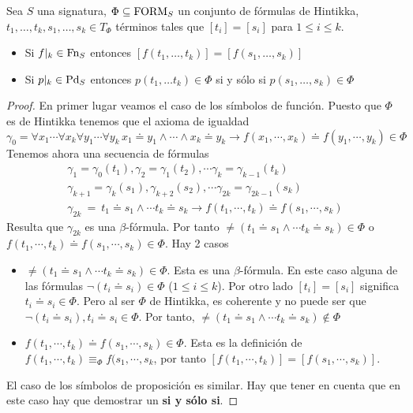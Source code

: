 \begin{prop}
  Sea $S$ una signatura, $\Phi\subseteq\mbox{FORM}_{S}$ un conjunto de fórmulas de Hintikka, $t_{1},\ldots, t_{k},s_{1},\ldots, s_{k}\in T_{\Phi}$ términos tales que $[t_{i}]=[s_{i}]$ para $1\leq i\leq k$.
  \begin{itemize}
  \item Si $f|_{k}\in \mbox{Fn}_{S}$ entonces $[f(t_{1},\ldots, t_{k})]=[f(s_{1},\ldots,s_{k})]$
  \item Si $p|_{k}\in \mbox{Pd}_{S}$ entonces $p(t_{1},\ldots t_{k})\in\Phi$ si y sólo si $p(s_{1},\ldots,s_{k})\in\Phi$
  \end{itemize}

  \begin{proof}
    En primer lugar veamos el caso de los símbolos de función. Puesto que $\Phi$ es de Hintikka tenemos que el axioma de igualdad
    \[ \gamma_{0}=\forall x_{1}\cdots\forall x_{k}\forall y_{1}\cdots \forall y_{k}\, x_{1}\doteq y_{1}\wedge\cdots \wedge x_{k}\doteq y_{k}\rightarrow f(x_{1},\cdots,x_{k})\doteq f(y_{1},\cdots,y_{k})\in\Phi \]
  Tenemos ahora una secuencia  de fórmulas
  \[ \begin{array}{l}
      \displaystyle\gamma_{1}=\gamma_{0}(t_{1}), \gamma_{2}=\gamma_{1}(t_{2}),
      \cdots \gamma_{k}=\gamma_{k-1}(t_{k})\\
      \gamma_{k+1}=\gamma_{k}(s_{1}),\gamma_{k+2}(s_{2}),
      \displaystyle\cdots\gamma_{2k}=\gamma_{2k-1}(s_{k})\\
      \gamma_{2k}\ =\ t_{1}\doteq s_{1}\wedge\cdots t_{k}\doteq s_{k}\rightarrow
      f(t_{1},\cdots, t_{k})\doteq f(s_{1},\cdots, s_{k})
    \end{array} \]
  Resulta que $\gamma_{2k}$ es una $\beta$-fórmula. Por tanto $\neq(t_{1}\doteq s_{1}\wedge\cdots t_{k}\doteq s_{k}) \in\Phi$ o $f(t_{1},\cdots, t_{k})\doteq f(s_{1},\cdots, s_{k})\in\Phi$. Hay 2 casos
 
  \begin{itemize}
  \item $\neq(t_{1}\doteq s_{1}\wedge\cdots t_{k}\doteq s_{k}) \in\Phi$. Esta es una $\beta$-fórmula.
    En este caso alguna de las fórmulas $\neg (t_{i}\doteq s_{i})\in\Phi$ ($1\leq i\leq k$). Por otro lado
    $[t_{i}]=[s_{i}]$ significa $t_{i}\doteq s_{i}\in\Phi$. Pero al ser $\Phi$ de Hintikka, es coherente y no puede ser que $\neg (t_{i}\doteq  s_{i}), t_{i}\doteq  s_{i}\in\Phi$. Por
    tanto, $\neq(t_{1}\doteq s_{1}\wedge\cdots t_{k}\doteq s_{k}) \not\in\Phi$
  \item $f(t_{1},\cdots, t_{k})\doteq f(s_{1},\cdots, s_{k})\in\Phi$. Esta es la definición de
    $ f(t_{1},\cdots, t_{k})\equiv_{\Phi} f(s_{1},\cdots, s_{k} $, por tanto $ [f(t_{1},\cdots,t_{k})]=[f(s_{1},\cdots, s_{k})] $.
  \end{itemize}

  El caso de los símbolos de proposición es similar. Hay que tener en cuenta que en este caso hay que demostrar un \textbf{si y sólo si}.
\end{proof}
\end{prop}


